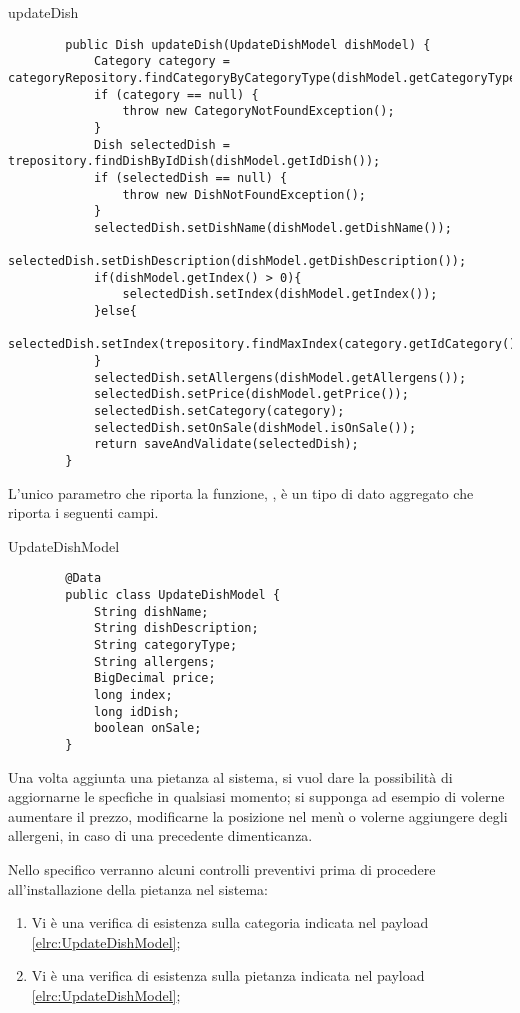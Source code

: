 \begin{elsrc}{updateDish}
	\begin{verbatim}
		public Dish updateDish(UpdateDishModel dishModel) {
			Category category = categoryRepository.findCategoryByCategoryType(dishModel.getCategoryType());
			if (category == null) {
				throw new CategoryNotFoundException();
			}
			Dish selectedDish = trepository.findDishByIdDish(dishModel.getIdDish());
			if (selectedDish == null) {
				throw new DishNotFoundException();
			}
			selectedDish.setDishName(dishModel.getDishName());
			selectedDish.setDishDescription(dishModel.getDishDescription());
			if(dishModel.getIndex() > 0){
				selectedDish.setIndex(dishModel.getIndex());
			}else{
				selectedDish.setIndex(trepository.findMaxIndex(category.getIdCategory()));
			}
			selectedDish.setAllergens(dishModel.getAllergens());
			selectedDish.setPrice(dishModel.getPrice());
			selectedDish.setCategory(category);
			selectedDish.setOnSale(dishModel.isOnSale());
			return saveAndValidate(selectedDish);
		}
	\end{verbatim}
\end{elsrc}

L'unico parametro che riporta la funzione, , è un tipo di dato aggregato che riporta i seguenti campi.

\begin{elsrc}{UpdateDishModel}
	\begin{verbatim}
		@Data
		public class UpdateDishModel {
			String dishName;
			String dishDescription;
			String categoryType;
			String allergens;
			BigDecimal price;
			long index;
			long idDish;
			boolean onSale;
		}
	\end{verbatim}
\end{elsrc}

Una volta aggiunta una pietanza al sistema, si vuol dare la possibilità di aggiornarne le specfiche
in qualsiasi momento; si supponga ad esempio di volerne aumentare il prezzo, modificarne
la posizione nel menù o volerne aggiungere degli allergeni, in caso di una precedente dimenticanza.

Nello specifico verranno alcuni controlli preventivi prima di procedere all'installazione
della pietanza nel sistema:
\begin{enumerate}
	\item Vi è una verifica di esistenza sulla categoria indicata nel payload \autoref{elrc:UpdateDishModel};
	\item Vi è una verifica di esistenza sulla pietanza indicata nel payload \autoref{elrc:UpdateDishModel};
\end{enumerate}


